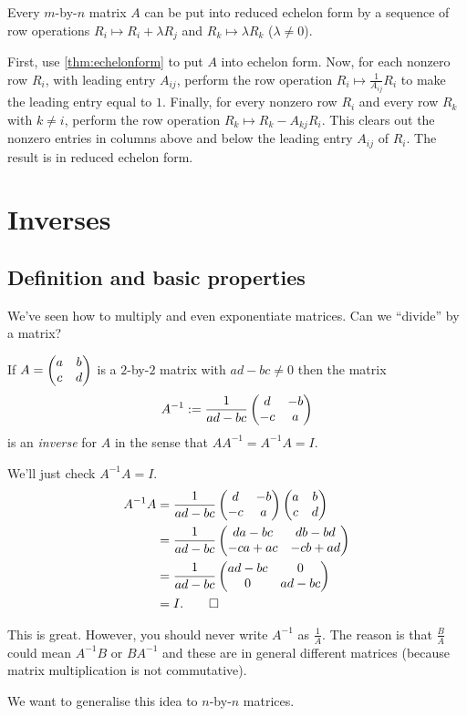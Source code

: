 \documentclass{article}
\begin{document}
\begin{Theorem}\label{thm:reducedechelonform}
Every \(m\)-by-\(n\) matrix \(A\) can be put into reduced echelon
form by a sequence of row operations \(R_i\mapsto R_i+\lambda R_j\)
and \(R_k\mapsto \lambda R_k\) (\(\lambda\neq 0\)).
\end{Theorem}
\begin{Proof}
First, use \cref{thm:echelonform} to put \(A\) into echelon
form. Now, for each nonzero row \(R_i\), with leading entry
\(A_{ij}\), perform the row operation
\(R_i\mapsto\frac{1}{A_{ij}}R_i\) to make the leading entry equal to
\(1\). Finally, for every nonzero row \(R_i\) and every row \(R_k\)
with \(k\neq i\), perform the row operation \(R_k\mapsto
R_k-A_{kj}R_i\). This clears out the nonzero entries in columns
above and below the leading entry \(A_{ij}\) of \(R_i\). The result
is in reduced echelon form. \qedhere


\end{Proof}
\clearpage
\section{Inverses}
\subsection{Definition and basic properties}


We've seen how to multiply and even exponentiate matrices. Can we
``divide'' by a matrix?


\begin{Theorem}
If \(A=\begin{pmatrix} a & b \\ c & d \end{pmatrix}\) is a \(2\)-by-\(2\) matrix with
\(ad-bc\neq 0\) then the matrix \[A^{-1}:=\frac{1}{ad-bc}\begin{pmatrix} d & -b
\\ -c & a\end{pmatrix}\] is an {\em inverse} for \(A\) in the sense that
\(AA^{-1}=A^{-1}A=I\).
\end{Theorem}
\begin{Proof}
We'll just check \(A^{-1}A=I\).
\begin{align*}
A^{-1}A&=\frac{1}{ad-bc}\begin{pmatrix} d & -b \\ -c & a\end{pmatrix}\begin{pmatrix} a & b \\ c & d\end{pmatrix}\\
&=\frac{1}{ad-bc}\begin{pmatrix} da-bc & db-bd \\ -ca+ac & -cb+ad\end{pmatrix}\\
&=\frac{1}{ad-bc}\begin{pmatrix} ad-bc & 0 \\ 0 & ad-bc\end{pmatrix}\\
&=I. \qedhere
\end{align*}


\end{Proof}
\begin{Remark}
This is great. However, you should never write \(A^{-1}\) as
\(\frac{1}{A}\). The reason is that \(\frac{B}{A}\) could mean
\(A^{-1}B\) or \(BA^{-1}\) and these are in general different
matrices (because matrix multiplication is not commutative).


\end{Remark}
We want to generalise this idea to \(n\)-by-\(n\) matrices.
\end{document}
